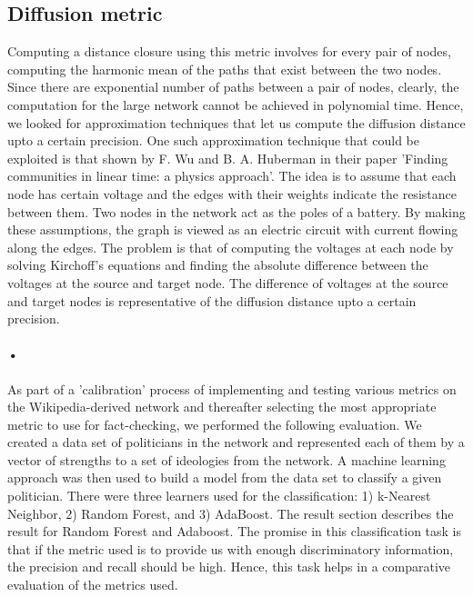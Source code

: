 \documentclass[12pt]{article}
\begin{document}
\subsection{Diffusion metric}
Computing a distance closure using this metric involves for every pair of nodes, computing the harmonic mean of the paths that exist between the two nodes. Since there are exponential number of paths between a pair of nodes, clearly, the computation for the large network cannot be achieved in polynomial time. Hence, we looked for approximation techniques that let us compute the diffusion distance upto a certain precision. One such approximation technique that could be exploited is that shown by F. Wu and B. A. Huberman in their paper 'Finding communities in linear time: a physics approach'. The idea is to assume that each node has certain voltage and the edges with their weights indicate the resistance between them. Two nodes in the network act as the poles of a battery. By making these assumptions, the graph is viewed as an electric circuit with current flowing along the edges. The problem is that of computing the voltages at each node by solving Kirchoff's equations and finding the absolute difference between the voltages at the source and target node. The difference of voltages at the source and target nodes is representative of the diffusion distance upto a certain precision. 

\paragraph{•}
As part of a 'calibration' process of implementing and testing various metrics on the Wikipedia-derived network and thereafter selecting the most appropriate metric to use for fact-checking, we performed the following evaluation. We created a data set of politicians in the network and represented each of them by a vector of strengths to a set of ideologies from the network. A machine learning approach was then used to build a model from the data set to classify a given politician. There were three learners used for the classification: 1) k-Nearest Neighbor, 2) Random Forest, and 3) AdaBoost. The result section describes the result for Random Forest and Adaboost. The promise in this classification task is that if the metric used is to provide us with enough discriminatory information, the precision and recall should be high. Hence, this task helps in a comparative evaluation of the metrics used.
\end{document}
